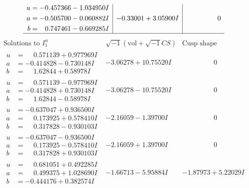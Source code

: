 \documentclass[1p]{elsarticle_modified}
\theoremstyle{definition}
\newcommand{\I}{\sqrt{-1}}
\begin{document}
$$\begin{array}{c|c|c}
\begin{aligned}
u &= -0.457366 - 1.034950 I \\
a &= -0.505700 - 0.060882 I \\
b &= \phantom{-}0.747461 - 0.669285 I\end{aligned}
 & -0.33001 + 3.05900 I & \phantom{-0.000000 } 0\\
 \hline 
 \end{array}$$\newpage$$\begin{array}{c|c|c}  
\text{Solutions to }I^u_{1}& \I (\text{vol} + \sqrt{-1}CS) & \text{Cusp shape}\\
 \hline 
\begin{aligned}
u &= \phantom{-}0.571139 + 0.977969 I \\
a &= -0.414828 - 0.730148 I \\
b &= \phantom{-}1.62844 + 0.58978 I\end{aligned}
 & -3.06278 + 10.75520 I & \phantom{-0.000000 } 0 \\ \hline\begin{aligned}
u &= \phantom{-}0.571139 - 0.977969 I \\
a &= -0.414828 + 0.730148 I \\
b &= \phantom{-}1.62844 - 0.58978 I\end{aligned}
 & -3.06278 - 10.75520 I & \phantom{-0.000000 } 0 \\ \hline\begin{aligned}
u &= -0.637047 + 0.936500 I \\
a &= \phantom{-}0.173925 + 0.578410 I \\
b &= \phantom{-}0.317828 - 0.930103 I\end{aligned}
 & -2.16059 - 1.39700 I & \phantom{-0.000000 } 0 \\ \hline\begin{aligned}
u &= -0.637047 - 0.936500 I \\
a &= \phantom{-}0.173925 - 0.578410 I \\
b &= \phantom{-}0.317828 + 0.930103 I\end{aligned}
 & -2.16059 + 1.39700 I & \phantom{-0.000000 } 0 \\ \hline\begin{aligned}
u &= \phantom{-}0.681051 + 0.492285 I \\
a &= \phantom{-}0.499375 + 1.028690 I \\
b &= -0.444176 + 0.382574 I\end{aligned}
 & -1.66713 - 5.95884 I & -1.87973 + 5.22029 I \\ \hline\begin{aligned}

\end{aligned}
\end{array}$$
\end{document}
